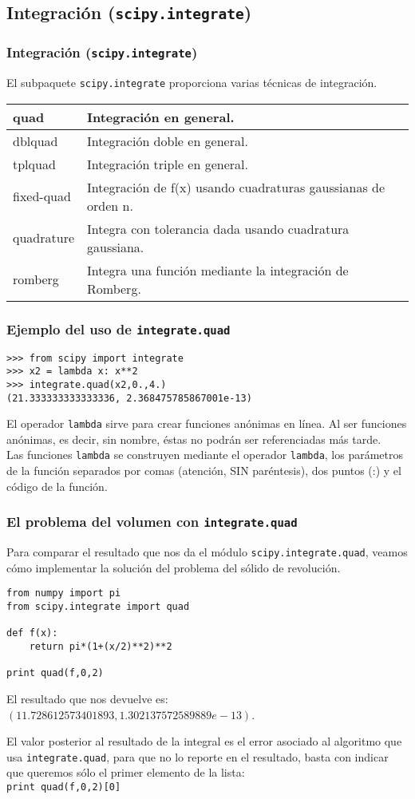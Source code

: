 \subsection{Integraci\'{o}n (\texttt{scipy.integrate})}
\begin{frame}
\frametitle{Integraci\'{o}n (\texttt{scipy.integrate})}
El subpaquete \texttt{scipy.integrate} proporciona varias t\'{e}cnicas de integraci\'{o}n.
\fontsize{12}{12}\selectfont
	\begin{tabular}{l | p{8cm}}
	quad 		& Integraci\'{o}n en general. \\ \hline
	dblquad 	& Integraci\'{o}n doble en general. \\ \hline
	tplquad 	& Integraci\'{o}n triple en general. \\ \hline
	fixed-quad 	& Integraci\'{o}n de f(x) usando cuadraturas gaussianas de orden n. \\ \hline
	quadrature 	& Integra con tolerancia dada usando cuadratura gaussiana. \\ \hline
	romberg 	& Integra una funci\'{o}n mediante la integraci\'{o}n de Romberg.
\end{tabular}
\end{frame}
\begin{frame}[fragile]
\frametitle{Ejemplo del uso de \texttt{integrate.quad}}
\begin{verbatim}
>>> from scipy import integrate
>>> x2 = lambda x: x**2
>>> integrate.quad(x2,0.,4.)
(21.333333333333336, 2.368475785867001e-13)
\end{verbatim}
El operador \texttt{lambda} sirve para crear funciones an\'{o}nimas en l\'{i}nea. Al ser funciones an\'{o}nimas, es decir, sin nombre, \'{e}stas no podr\'{a}n ser referenciadas m\'{a}s tarde.
\\
\medskip
Las funciones \texttt{lambda} se construyen mediante el operador \texttt{lambda}, los par\'{a}metros de la funci\'{o}n separados por comas (atenci\'{o}n, SIN par\'{e}ntesis), dos puntos (:) y el c\'{o}digo de la funci\'{o}n.
\end{frame}
\begin{frame}[fragile]
\frametitle{El problema del volumen con \texttt{integrate.quad}}
Para comparar el resultado que nos da el m\'{o}dulo \texttt{scipy.integrate.quad}, veamos c\'{o}mo implementar la soluci\'{o}n del problema del s\'{o}lido de revoluci\'{o}n.
\begin{lstlisting}
from numpy import pi
from scipy.integrate import quad

def f(x):
    return pi*(1+(x/2)**2)**2
   
print quad(f,0,2)
\end{lstlisting}
El resultado que nos devuelve es: $(11.728612573401893, 1.302137572589889e-13)$.
\end{frame}
\begin{frame}[fragile]
El valor posterior al resultado de la integral es el error asociado al algoritmo que usa \texttt{integrate.quad}, para que no lo reporte en el resultado, basta con indicar que queremos s\'{o}lo el primer elemento de la lista:
\\
\bigskip
\verb|print quad(f,0,2)[0]|
\end{frame}
